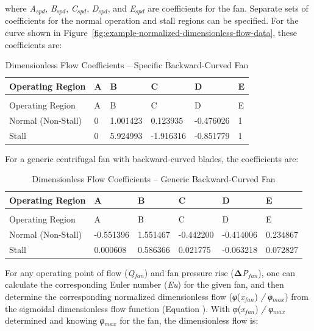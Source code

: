 where \emph{A\(_{spd}\)}, \emph{B\(_{spd}\)}, \emph{C\(_{spd}\)}, \emph{D\(_{spd}\)}, and \emph{E\(_{spd}\)} are coefficients for the fan. Separate sets of coefficients for the normal operation and stall regions can be specified. For the curve shown in Figure~\ref{fig:example-normalized-dimensionless-flow-data}, these coefficients are:

\begin{longtable}[c]{@{}llllll@{}}
\caption{Dimensionless Flow Coefficients – Specific Backward-Curved Fan \label{table:dimensionless-flow-coefficients-specific}} \tabularnewline
\toprule 
Operating Region & A & B & C & D & E \tabularnewline
\midrule
\endfirsthead

\caption[]{Dimensionless Flow Coefficients – Specific Backward-Curved Fan} \tabularnewline
\toprule 
Operating Region & A & B & C & D & E \tabularnewline
\midrule
\endhead

Normal (Non-Stall) & 0 & 1.001423 & 0.123935 & -0.476026 & 1 \tabularnewline
Stall & 0 & 5.924993 & -1.916316 & -0.851779 & 1 \tabularnewline
\bottomrule
\end{longtable}

For a generic centrifugal fan with backward-curved blades, the coefficients are:

\begin{longtable}[c]{@{}llllll@{}}
\caption{Dimensionless Flow Coefficients – Generic Backward-Curved Fan \label{table:dimensionless-flow-coefficients-generic}} \tabularnewline
\toprule 
Operating Region & A & B & C & D & E \tabularnewline
\midrule
\endfirsthead

\caption[]{Dimensionless Flow Coefficients – Generic Backward-Curved Fan} \tabularnewline
\toprule 
Operating Region & A & B & C & D & E \tabularnewline
\midrule
\endhead

Normal (Non-Stall) & -0.551396 & 1.551467 & -0.442200 & -0.414006 & 0.234867 \tabularnewline
Stall & 0.000608 & 0.586366 & 0.021775 & -0.063218 & 0.072827 \tabularnewline
\bottomrule
\end{longtable}

For any operating point of flow (\emph{Q\(_{fan}\)}) and fan pressure rise (\textbf{Δ}\emph{P\(_{fan}\)}), one can calculate the corresponding Euler number (\emph{Eu}) for the given fan, and then determine the corresponding normalized dimensionless flow (\emph{φ}(\emph{x\(_{fan}\)}) \emph{/} \emph{φ\(_{max}\)}) from the sigmoidal dimensionless flow function (Equation ). With \emph{φ}(\emph{x\(_{fan}\)}) \emph{/} \emph{φ\(_{max}\)} determined and knowing \emph{φ\(_{max}\)} for the fan, the dimensionless flow is:


